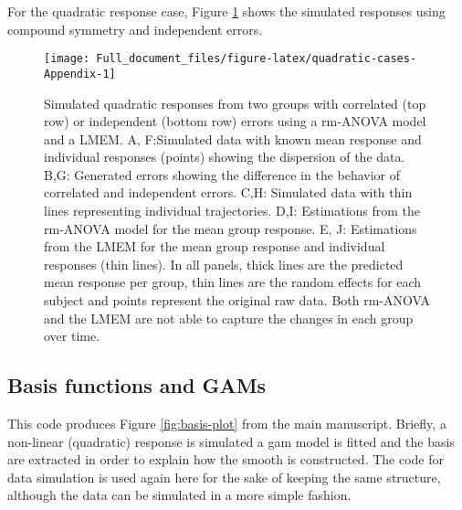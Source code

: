 \documentclass[
]{article}
\begin{document}
For the quadratic response case, Figure \ref{fig:quadratic-cases-Appendix} shows the simulated responses using compound symmetry and independent errors.



\begin{figure}[H]
\texttt{[image: Full\_document\_files/figure-latex/quadratic-cases-Appendix-1]} \caption{Simulated quadratic responses from two groups with correlated (top row) or independent (bottom row) errors using a rm-ANOVA model and a LMEM. A, F:Simulated data with known mean response and individual responses (points) showing the dispersion of the data. B,G: Generated errors showing the difference in the behavior of correlated and independent errors. C,H: Simulated data with thin lines representing individual trajectories. D,I: Estimations from the rm-ANOVA model for the mean group response. E, J: Estimations from the LMEM for the mean group response and individual responses (thin lines). In all panels, thick lines are the predicted mean response per group, thin lines are the random effects for each subject and points represent the original raw data. Both rm-ANOVA and the LMEM are not able to capture the changes in each group over time.}\label{fig:quadratic-cases-Appendix}
\end{figure}

\hypertarget{basis-functions-and-gams}{%
\subsection{Basis functions and GAMs}\label{basis-functions-and-gams}}

This code produces Figure \ref{fig:basis-plot} from the main manuscript. Briefly, a non-linear (quadratic) response is simulated a gam model is fitted and the basis are extracted in order to explain how the smooth is constructed. The code for data simulation is used again here for the sake of keeping the same structure, although the data can be simulated in a more simple fashion.
\end{document}
